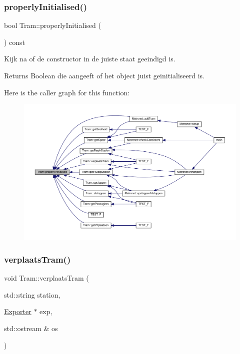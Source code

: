 \subsubsection{\texorpdfstring{properly\+Initialised()}{properlyInitialised()}}
{\footnotesize\ttfamily bool Tram\+::properly\+Initialised (\begin{DoxyParamCaption}{ }\end{DoxyParamCaption}) const}



Kijk na of de constructor in de juiste staat geeindigd is. 

\begin{DoxyReturn}{Returns}
Boolean die aangeeft of het object juist geinitialiseerd is. 
\end{DoxyReturn}
Here is the caller graph for this function\+:\nopagebreak
\begin{figure}[H]
\begin{center}
\leavevmode
\includegraphics[width=350pt]{class_tram_ac2688f590e4db232b4f535c9bf959efb_icgraph}
\end{center}
\end{figure}
\mbox{\label{class_tram_a8d55296c7ede4aa92c9b3a4b2a9495a8}} 
\subsubsection{\texorpdfstring{verplaats\+Tram()}{verplaatsTram()}}
{\footnotesize\ttfamily void Tram\+::verplaats\+Tram (\begin{DoxyParamCaption}\item[{std\+::string}]{station,  }\item[{\hyperlink{class_exporter}{Exporter} $\ast$}]{exp,  }\item[{std\+::ostream \&}]{os }\end{DoxyParamCaption})}



